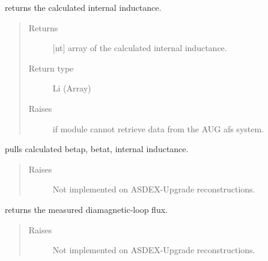 \documentclass[letterpaper,10pt,english]{sphinxmanual}
\begin{document}
\begin{fulllineitems}
\begin{fulllineitems}
\label{\detokenize{eqtools:eqtools.AUGData.AUGDDData.getLi}}
returns the calculated internal inductance.
\begin{quote}\begin{description}
\item[{Returns}] \leavevmode
{[}nt{]} array of the calculated internal inductance.

\item[{Return type}] \leavevmode
Li (Array)

\item[{Raises}] \leavevmode
{} \textendash{} if module cannot retrieve data from the AUG afs system.

\end{description}\end{quote}

\end{fulllineitems}


\begin{fulllineitems}
\label{\detokenize{eqtools:eqtools.AUGData.AUGDDData.getBetas}}
pulls calculated betap, betat, internal inductance.
\begin{quote}\begin{description}
\item[{Raises}] \leavevmode
{} \textendash{} Not implemented on ASDEX-Upgrade reconstructions.

\end{description}\end{quote}

\end{fulllineitems}


\begin{fulllineitems}
\label{\detokenize{eqtools:eqtools.AUGData.AUGDDData.getDiamagFlux}}
returns the measured diamagnetic-loop flux.
\begin{quote}\begin{description}
\item[{Raises}] \leavevmode
{} \textendash{} Not implemented on ASDEX-Upgrade reconstructions.


\end{description}
\end{quote}
\end{fulllineitems}
\end{fulllineitems}
\end{document}
